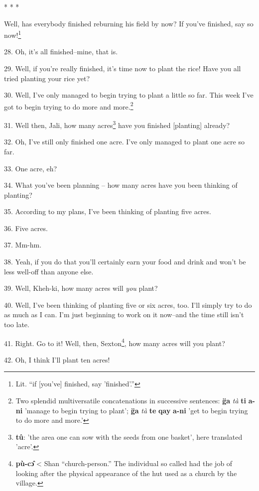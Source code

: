 \begin{center}
* * *
\end{center}

Well, has everybody finished reburning his field by now? If you've finished, say
so now!\footnote{Lit. ``if [you've] finished, say 'finished'.''}

28. Oh, it's all finished--mine, that is.

29. Well, if you're really finished, it's time now to plant the rice! Have you
all tried planting your rice yet?

30. Well, I've only managed to begin trying to plant a little so far. This week
I've got to begin trying to do more and more.\footnote{Two splendid multiversatile concatenations in successive sentences: \textbf{g̈a} \textit{\emph{tà}} \textbf{ti} \textbf{a-ni} 'manage to begin trying to plant'; \textbf{g̈a} \textit{\emph{tà}} \textbf{te} \textbf{qay} \textbf{a-ni} 'get to begin trying to do more and more.'}

31. Well then, Jali, how many acres\footnote{\textbf{tû}: 'the area one can sow with the seeds from one basket', here translated 'acre'.} have you finished [planting] already?

32. Oh, I've still only finished one acre. I've only managed to plant one acre
so far.

33. One acre, eh?

34. What you've been planning -- how many acres have you been thinking of planting?

35. According to my plans, I've been thinking of planting five acres.

36. Five acres.

37. Mm-hm.

38. Yeah, if you do that you'll certainly earn your food and drink and won't be
less well-off than anyone else.

39. Well, Kheh-ki, how many acres will \emph{you} plant?

40. Well, I've been thinking of planting five or six acres, too. I'll simply try
to do as much as I can. I'm just beginning to work on it now--and the time still
isn't too late.

41. Right. Go to it! Well, then, Sexton\footnote{\textbf{pù-cɔ̂} < Shan ``church-person.'' The individual so called had the job of looking after the physical appearance of the hut used as a church by the village.}, how many acres will you plant?

42. Oh, I think I'll plant ten acres!

